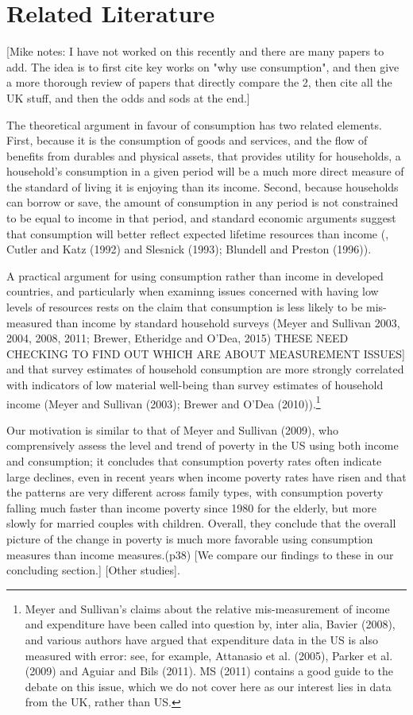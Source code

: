 \section{Related Literature}\label{sec:literature}

[Mike notes: I have not worked on this recently and there are many papers to add. The idea is to first cite key works on "why use consumption", and then give a more thorough review of papers that directly compare the 2, then cite all the UK stuff, and then the odds and sods at the end.]


The theoretical argument in favour of consumption has two related elements. First, because it is the consumption of goods and services, and the flow of benefits from durables and physical assets, that provides utility for households, a household's consumption in a given period will be a much more direct measure of the standard of living it is enjoying than its income. Second, because households can borrow or save, the amount of consumption in any period is not constrained to be equal to income in that period, and standard economic arguments suggest that consumption will better reflect expected lifetime resources than income (\cite{Poterba1989}, Cutler and Katz (1992) and Slesnick (1993); Blundell and Preston (1996)).

A practical argument for using consumption rather than income in developed countries, and particularly when examinng issues concerned with having low levels of resources rests on the claim that consumption is less likely to be mis-measured than income by standard household surveys  (Meyer and Sullivan 2003, 2004, 2008, 2011; Brewer, Etheridge and O'Dea, 2015) THESE NEED CHECKING TO FIND OUT WHICH ARE ABOUT MEASUREMENT ISSUES] and that survey estimates of household consumption are more strongly correlated with indicators of low material well-being than survey estimates of household income (Meyer and Sullivan (2003); Brewer and O'Dea (2010)).\footnote{Meyer and Sullivan's claims about the relative mis-measurement of income and expenditure have been called into question by, inter alia, Bavier (2008), and various authors have argued that expenditure data in the US is also measured with error: see, for example, Attanasio et al. (2005), Parker et al. (2009) and Aguiar and Bils (2011). MS (2011) contains a good guide to the debate on this issue, which we do not cover here as our interest lies in data from the UK, rather than US.}



Our motivation is similar to that of Meyer and Sullivan (2009), who comprensively assess the level and trend of poverty in the US using both income and consumption; it concludes that consumption poverty rates often indicate large declines, even in recent years when income poverty rates have risen and that the patterns are very different across family types, with consumption poverty falling much faster than income poverty since 1980 for the elderly, but more slowly for married couples with children. Overall, they conclude that the overall picture of the change in poverty is much more favorable using consumption measures than income measures.(p38) [We compare our findings to these in our concluding section.]
[Other studies].

